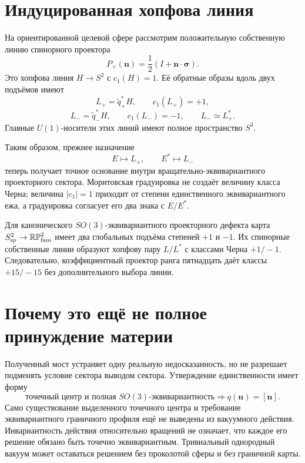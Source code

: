 \section{Индуцированная хопфова линия}

На ориентированной целевой сфере рассмотрим положительную собственную
линию спинорного проектора
\begin{equation}
 P_+(\mathbf n)=\frac12
 \left(I+\mathbf n\cdot\boldsymbol\sigma\right).
\end{equation}
Это хопфова линия $H\to S^2$ с $c_1(H)=1$. Её обратные образы вдоль двух
подъёмов имеют
\begin{equation}
 L_+=\widetilde q_+^*H,
 \qquad c_1(L_+)=+1,
\end{equation}
\begin{equation}
 L_-=\widetilde q_-^*H,
 \qquad c_1(L_-)=-1,
 \qquad L_-\simeq L_+^*.
 \label{eq:v5-spin-bridge-hopf-pair}
\end{equation}
Главные $U(1)$-носители этих линий имеют полное пространство $S^3$.

Таким образом, прежнее назначение
\begin{equation}
 E\longmapsto L_+,
 \qquad
 E^*\longmapsto L_-
\end{equation}
теперь получает точное основание внутри вращательно-эквивариантного
проекторного сектора. Моритовская градуировка не создаёт величину класса
Черна; величина $|c_1|=1$ приходит от степени единственного
эквивариантного ежа, а градуировка согласует его два знака с $E/E^*$.

\begin{theorem}
Для канонического $SO(3)$-эквивариантного проекторного дефекта карта
$S^2_{\rm sp}\to\mathbb{RP}^2_{\rm fam}$ имеет два глобальных подъёма
степеней $+1$ и $-1$. Их спинорные собственные линии образуют хопфову пару
$L/L^*$ с классами Черна $+1/-1$. Следовательно, коэффициентный проектор
ранга пятнадцать даёт классы $+15/-15$ без дополнительного выбора линии.
\end{theorem}

\section{Почему это ещё не полное принуждение материи}

Полученный мост устраняет одну реальную недосказанность, но не разрешает
подменять условие сектора выводом сектора. Утверждение единственности имеет
форму
\begin{equation}
 \text{точечный центр и полная }SO(3)\text{-эквивариантность}
 \Longrightarrow q(\mathbf n)=[\mathbf n].
 \label{eq:v5-spin-bridge-conditional-chain}
\end{equation}
Само существование выделенного точечного центра и требование
эквивариантного граничного профиля ещё не выведены из вакуумного действия.
Инвариантность действия относительно вращений не означает, что каждое его
решение обязано быть точечно эквивариантным. Тривиальный однородный вакуум
может оставаться решением без проколотой сферы и без граничной карты.

